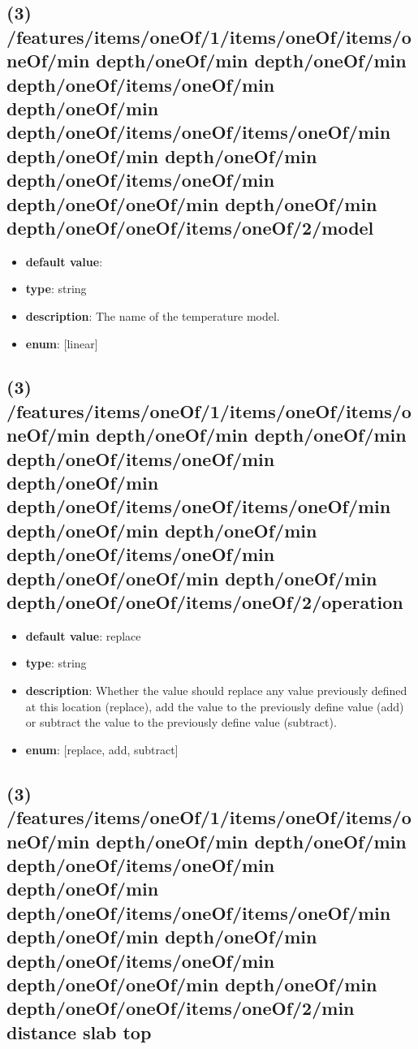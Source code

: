 \subsection{(3) /features/items/oneOf/1/items/oneOf/items/oneOf/min depth/oneOf/min depth/oneOf/min depth/oneOf/items/oneOf/min depth/oneOf/min depth/oneOf/items/oneOf/items/oneOf/min depth/oneOf/min depth/oneOf/min depth/oneOf/items/oneOf/min depth/oneOf/oneOf/min depth/oneOf/min depth/oneOf/oneOf/items/oneOf/2/model}
\begin{itemize}[leftmargin=3em]\item {\bf default value}: 
\item {\bf type}: string
\item {\bf description}: The name of the temperature model.
\item {\bf enum}: [linear]\end{itemize}\subsection{(3) /features/items/oneOf/1/items/oneOf/items/oneOf/min depth/oneOf/min depth/oneOf/min depth/oneOf/items/oneOf/min depth/oneOf/min depth/oneOf/items/oneOf/items/oneOf/min depth/oneOf/min depth/oneOf/min depth/oneOf/items/oneOf/min depth/oneOf/oneOf/min depth/oneOf/min depth/oneOf/oneOf/items/oneOf/2/operation}
\begin{itemize}[leftmargin=3em]\item {\bf default value}: replace
\item {\bf type}: string
\item {\bf description}: Whether the value should replace any value previously defined at this location (replace), add the value to the previously define value (add) or subtract the value to the previously define value (subtract).
\item {\bf enum}: [replace, add, subtract]\end{itemize}\subsection{(3) /features/items/oneOf/1/items/oneOf/items/oneOf/min depth/oneOf/min depth/oneOf/min depth/oneOf/items/oneOf/min depth/oneOf/min depth/oneOf/items/oneOf/items/oneOf/min depth/oneOf/min depth/oneOf/min depth/oneOf/items/oneOf/min depth/oneOf/oneOf/min depth/oneOf/min depth/oneOf/oneOf/items/oneOf/2/min distance slab top}

